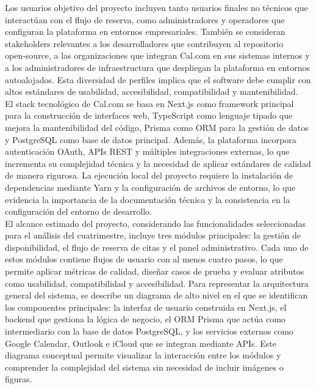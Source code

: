 \documentclass{article}
\begin{document}
Los usuarios objetivo del proyecto incluyen tanto usuarios finales no técnicos que interactúan con el flujo de reserva, como administradores y operadores que configuran la plataforma en entornos empresariales. También se consideran stakeholders relevantes a los desarrolladores que contribuyen al repositorio open‑source, a las organizaciones que integran Cal.com en sus sistemas internos y a los administradores de infraestructura que despliegan la plataforma en entornos autoalojados. Esta diversidad de perfiles implica que el software debe cumplir con altos estándares de usabilidad, accesibilidad, compatibilidad y mantenibilidad.\\

El stack tecnológico de Cal.com se basa en Next.js como framework principal para la construcción de interfaces web, TypeScript como lenguaje tipado que mejora la mantenibilidad del código, Prisma como ORM para la gestión de datos y PostgreSQL como base de datos principal. Además, la plataforma incorpora autenticación OAuth, APIs REST y múltiples integraciones externas, lo que incrementa su complejidad técnica y la necesidad de aplicar estándares de calidad de manera rigurosa. La ejecución local del proyecto requiere la instalación de dependencias mediante Yarn y la configuración de archivos de entorno, lo que evidencia la importancia de la documentación técnica y la consistencia en la configuración del entorno de desarrollo.\\

El alcance estimado del proyecto, considerando las funcionalidades seleccionadas para el análisis del cuatrimestre, incluye tres módulos principales: la gestión de disponibilidad, el flujo de reserva de citas y el panel administrativo. Cada uno de estos módulos contiene flujos de usuario con al menos cuatro pasos, lo que permite aplicar métricas de calidad, diseñar casos de prueba y evaluar atributos como usabilidad, compatibilidad y accesibilidad. Para representar la arquitectura general del sistema, se describe un diagrama de alto nivel en el que se identifican los componentes principales: la interfaz de usuario construida en Next.js, el backend que gestiona la lógica de negocio, el ORM Prisma que actúa como intermediario con la base de datos PostgreSQL, y los servicios externos como Google Calendar, Outlook e iCloud que se integran mediante APIs. Este diagrama conceptual permite visualizar la interacción entre los módulos y comprender la complejidad del sistema sin necesidad de incluir imágenes o figuras.
\end{document}
